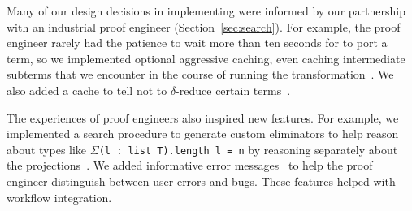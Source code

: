 Many of our design decisions in implementing \toolnamec were informed by our partnership with
an industrial proof engineer (Section~\ref{sec:search}).
For example, the proof engineer rarely had the patience to wait more than ten seconds
for \toolnamec to port a term,
so we implemented optional aggressive caching, even caching intermediate subterms that
we encounter in the course of running the transformation~\href{https://github.com/uwplse/pumpkin-pi/blob/silent/plugin/src/cache/caching.ml}{}. %
We also added a cache to tell \toolnamec not to $\delta$-reduce certain terms~\href{https://github.com/uwplse/pumpkin-pi/blob/silent/plugin/src/cache/caching.ml}{}.


The experiences of proof engineers also inspired new features.
For example, we implemented a search procedure to generate custom eliminators %
to help reason about types like $\Sigma$\lstinline{(l : list T).length l = n}
by reasoning separately about the projections~\href{https://github.com/uwplse/pumpkin-pi/blob/silent/plugin/src/automation/search/smartelim.ml}{}. %
We added informative error messages~\href{https://github.com/uwplse/pumpkin-pi/blob/silent/plugin/src/lib/ornerrors.ml}{} to help the proof engineer distinguish between user errors and bugs. %
These features helped with workflow integration. %

